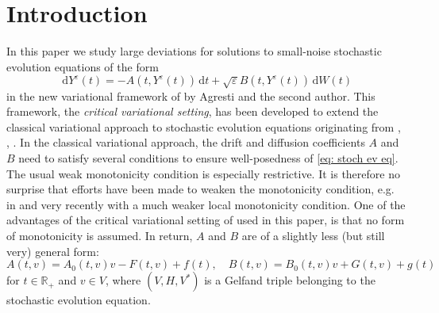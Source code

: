 \documentclass{amsart}
\newcommand{\dd}{\,\mathrm{d}}
\newcommand{\<}{\langle}
\newcommand{\?}{\rangle}
\theoremstyle{plain}
\theoremstyle{remark}
\theoremstyle{plain}
\numberwithin{equation}{section}
\def\R{{\mathbb R}}
\newcommand{\eps}{\varepsilon}
\begin{document}
\maketitle
{}

\tableofcontents


\section{Introduction}
In this paper we study large deviations for solutions to small-noise stochastic evolution equations of the form
\begin{equation}\label{eq: stoch ev eq}
  \dd Y^\eps(t)=-A(t,Y^\eps(t))\dd t+\sqrt{\eps}B(t,Y^\eps(t))\dd W(t)
\end{equation}
in the new variational framework of \cite{AV22variational} by Agresti and the second author. This framework, the \emph{critical variational setting}, has been developed to extend the classical variational approach to stochastic evolution equations originating from \cite{bensoussan72}, \cite{pardoux},  \cite{krylov81}. In the classical variational approach, the drift and diffusion coefficients $A$ and $B$ need to satisfy several conditions to ensure well-posedness of \eqref{eq: stoch ev eq}. The usual weak monotonicity condition is especially restrictive. It is therefore no surprise that efforts have been made to weaken the monotonicity condition, e.g. \!in \cite[\S 5.2]{liurockner15}  and very recently \cite{rockner22} with a much weaker local monotonicity condition. One of the advantages of the critical variational setting of \cite{AV22variational} used in this paper, is that no form of monotonicity is assumed. In return, $A$ and $B$ are of a slightly less (but still very) general form:
\[
A(t,v)=A_0(t,v)v-F(t,v)+f(t), \quad B(t,v)=B_0(t,v)v+G(t,v)+g(t)
\]
for $t\in\R_+$ and $v\in V$, where $(V,H,V^*)$ is a Gelfand triple belonging to the stochastic evolution equation.
\end{document}
